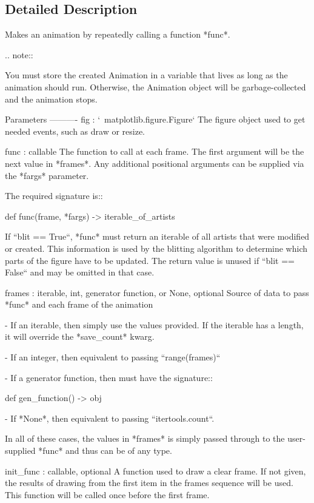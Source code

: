 \subsection{Detailed Description}
\begin{DoxyVerb}Makes an animation by repeatedly calling a function *func*.

.. note::

    You must store the created Animation in a variable that lives as long
    as the animation should run. Otherwise, the Animation object will be
    garbage-collected and the animation stops.

Parameters
----------
fig : `~matplotlib.figure.Figure`
    The figure object used to get needed events, such as draw or resize.

func : callable
    The function to call at each frame.  The first argument will
    be the next value in *frames*.   Any additional positional
    arguments can be supplied via the *fargs* parameter.

    The required signature is::

        def func(frame, *fargs) -> iterable_of_artists

    If ``blit == True``, *func* must return an iterable of all artists
    that were modified or created. This information is used by the blitting
    algorithm to determine which parts of the figure have to be updated.
    The return value is unused if ``blit == False`` and may be omitted in
    that case.

frames : iterable, int, generator function, or None, optional
    Source of data to pass *func* and each frame of the animation

    - If an iterable, then simply use the values provided.  If the
      iterable has a length, it will override the *save_count* kwarg.

    - If an integer, then equivalent to passing ``range(frames)``

    - If a generator function, then must have the signature::

         def gen_function() -> obj

    - If *None*, then equivalent to passing ``itertools.count``.

    In all of these cases, the values in *frames* is simply passed through
    to the user-supplied *func* and thus can be of any type.

init_func : callable, optional
    A function used to draw a clear frame. If not given, the results of
    drawing from the first item in the frames sequence will be used. This
    function will be called once before the first frame.


\end{DoxyVerb}
